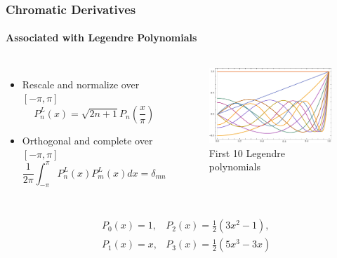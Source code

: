 \documentclass{beamer}
\begin{document}


\begin{frame}
\frametitle{Chromatic Derivatives}
\framesubtitle{Associated with Legendre Polynomials}
\begin{columns}[c]
\begin{itemize}
	\item Rescale and normalize
		over $[-\pi, \pi]$
	\begin{equation*}
		P_n^L(x) = \sqrt{2n+1}P_n\left(\frac{x}{\pi}\right)
	\end{equation*}
	\item \alert{Orthogonal} and \alert{complete} over $[-\pi, \pi]$
	\begin{equation*}
		\frac{1}{2\pi} \int_{-\pi}^{\pi} P_n^L(x) P_m^L(x) dx = \delta_{mn}
	\end{equation*}
\end{itemize}
\begin{figure} %
\centering
	\includegraphics[width=\columnwidth]{../figures/legendre}
\caption{First 10 Legendre polynomials}
\end{figure}
\end{columns}
\begin{example}
\begin{align*}
& P_0(x) = 1, & P_2(x) = \frac{1}{2}(3x^2-1), \\
& P_1(x) = x, 
& P_3(x) = \frac{1}{2}(5x^3-3x)
\end{align*}
\end{example}
\end{frame}

\end{document}

